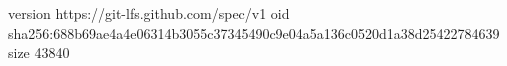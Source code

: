 version https://git-lfs.github.com/spec/v1
oid sha256:688b69ae4a4e06314b3055c37345490c9e04a5a136c0520d1a38d25422784639
size 43840
